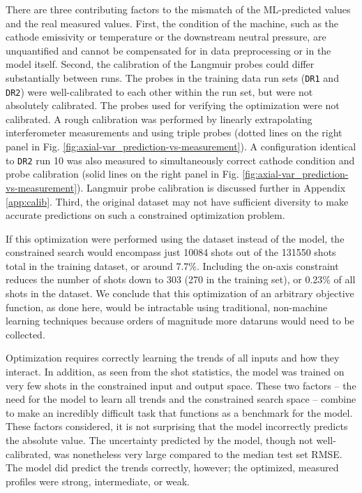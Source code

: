 There are three contributing factors to the mismatch of the ML-predicted values and the real measured values. First, the condition of the machine, such as the cathode emissivity or temperature or the downstream neutral pressure, are unquantified and cannot be compensated for in data preprocessing or in the model itself. Second, the calibration of the Langmuir probes could differ substantially between runs. The probes in the training data run sets (\texttt{DR1} and \texttt{DR2}) were well-calibrated to each other within the run set, but were not absolutely calibrated. The probes used for verifying the optimization were not calibrated. A rough calibration was performed by linearly extrapolating interferometer measurements and using triple probes (dotted lines on the right panel in Fig. \ref{fig:axial-var_prediction-vs-measurement}). A configuration identical to \texttt{DR2} run 10 was also measured to simultaneously correct cathode condition and probe calibration (solid lines on the right panel in Fig. \ref{fig:axial-var_prediction-vs-measurement}). Langmuir probe calibration is discussed further in Appendix \ref{app:calib}. Third, the original dataset may not have sufficient diversity to make accurate predictions on such a constrained optimization problem.

If this optimization were performed using the dataset instead of the model, the constrained search would encompass just 10084 shots out of the 131550 shots total in the training dataset, or around 7.7\%. Including the on-axis constraint reduces the number of shots down to 303 (270 in the training set), or 0.23\% of all shots in the dataset. We conclude that this optimization of an arbitrary objective function, as done here, would be intractable using traditional, non-machine learning techniques because orders of magnitude more dataruns would need to be collected. 

Optimization requires correctly learning the trends of all inputs and how they interact. In addition, as seen from the shot statistics, the model was trained on very few shots in the constrained input and output space. These two factors -- the need for the model to learn all trends and the constrained search space -- combine to make an incredibly difficult task that functions as a benchmark for the model. These factors considered, it is not surprising that the model incorrectly predicts the absolute value. The uncertainty predicted by the model, though not well-calibrated, was nonetheless very large compared to the median test set RMSE. The model did predict the trends correctly, however; the optimized, measured profiles were strong, intermediate, or weak.

